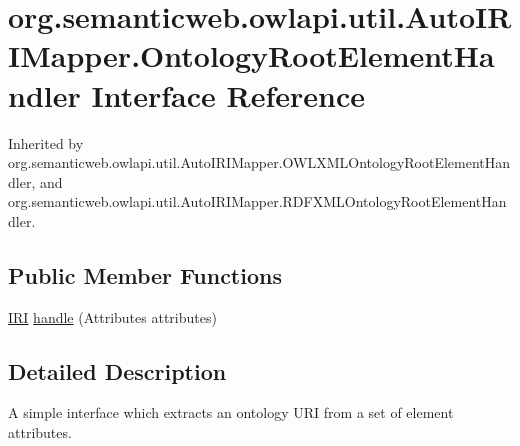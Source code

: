 \hypertarget{interfaceorg_1_1semanticweb_1_1owlapi_1_1util_1_1_auto_i_r_i_mapper_1_1_ontology_root_element_handler}{\section{org.\-semanticweb.\-owlapi.\-util.\-Auto\-I\-R\-I\-Mapper.\-Ontology\-Root\-Element\-Handler Interface Reference}
\label{interfaceorg_1_1semanticweb_1_1owlapi_1_1util_1_1_auto_i_r_i_mapper_1_1_ontology_root_element_handler}
}


Inherited by org.\-semanticweb.\-owlapi.\-util.\-Auto\-I\-R\-I\-Mapper.\-O\-W\-L\-X\-M\-L\-Ontology\-Root\-Element\-Handler, and org.\-semanticweb.\-owlapi.\-util.\-Auto\-I\-R\-I\-Mapper.\-R\-D\-F\-X\-M\-L\-Ontology\-Root\-Element\-Handler.

\subsection*{Public Member Functions}
\begin{DoxyCompactItemize}
\item 
\hyperlink{classorg_1_1semanticweb_1_1owlapi_1_1model_1_1_i_r_i}{I\-R\-I} \hyperlink{interfaceorg_1_1semanticweb_1_1owlapi_1_1util_1_1_auto_i_r_i_mapper_1_1_ontology_root_element_handler_a8c9f368cf2c768bbffd7e323cc173717}{handle} (Attributes attributes)
\end{DoxyCompactItemize}


\subsection{Detailed Description}
A simple interface which extracts an ontology U\-R\-I from a set of element attributes. 


